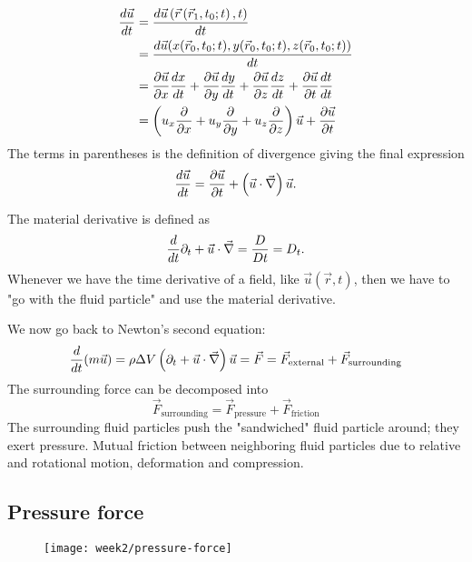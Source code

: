 \begin{align}
\frac{d \vec{u}}{d t} &= \frac{d \vec{u}\left(\vec{r}\left(\vec{r}_1,t_0;t\right),t\right)}{d t}\\
&=\frac{d \vec{u}(x(\vec{r}_0,t_0;t),y(\vec{r}_0,t_0;t),z(\vec{r}_0,t_0;t))}{d t}\\
&=\frac{\partial \vec{u}}{\partial x}\frac{d x}{d t} + \frac{\partial \vec{u}}{\partial y}\frac{d y}{d t} + \frac{\partial \vec{u}}{\partial z}\frac{d z}{d t} + \frac{\partial \vec{u}}{\partial t}\frac{d t}{d t}\\
&= \left(u_x\frac{\partial }{\partial x} + u_y\frac{\partial }{\partial y} + u_z\frac{\partial }{\partial z}\right)\vec{u}+\frac{\partial \vec{u}}{\partial t}
\end{align}
The terms in parentheses is the definition of divergence giving the final expression
\begin{equation}
\frac{d \vec{u}}{d t} = \frac{\partial \vec{u}}{\partial t} + \left(\vec{u}\cdot\vec{\nabla}\right)\vec{u}.
\end{equation}

\begin{framed}
The material derivative is defined as
\begin{equation}
\frac{d }{d t}\partial_t+\vec{u}\cdot\vec{\nabla}=\frac{D}{Dt}=D_t.
\end{equation}
Whenever we have the time derivative of a field, like $\vec{u}(\vec{r},t)$, then we have to "go with the fluid particle" and use the material derivative.
\end{framed}
We now go back to Newton's second equation:
\begin{equation}
\frac{d }{d t}(m\vec{u}) = \rho\Delta V\left(\partial_t + \vec{u}\cdot\vec{\nabla}\right)\vec{u} = \vec{F} = \vec{F}_\mathrm{external} + \vec{F}_\mathrm{surrounding}
\end{equation}
The surrounding force can be decomposed into
\begin{equation}
\vec{F}_\mathrm{surrounding} = \vec{F}_\mathrm{pressure} + \vec{F}_\mathrm{friction}
\end{equation}
The surrounding fluid particles push the "sandwiched" fluid particle around; they exert pressure. Mutual friction between neighboring fluid particles due to relative and rotational motion, deformation and compression.


\subsection{Pressure force}
\begin{figure}[!h]
    \centering
    \texttt{[image: week2/pressure-force]}
    \caption{}
    \label{fig:pressure-force}
\end{figure}

